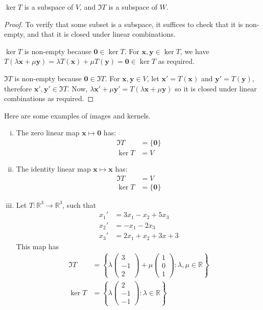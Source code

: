 \documentclass{article}
\begin{document}
\begin{lemma}
	$\ker T$ is a subspace of $V$, and $\Im T$ is a subspace of $W$.
\end{lemma}
\begin{proof}
	To verify that some subset is a subspace, it suffices to check that it is non-empty, and that it is closed under linear combinations.

	$\ker T$ is non-empty because $\bm 0 \in \ker T$. For $\bm x, \bm y \in \ker T$, we have $T(\lambda \bm x + \mu \bm y) = \lambda T(\bm x) + \mu T(\bm y) = \bm 0 \in \ker T$ as required.

	$\Im T$ is non-empty because $\bm 0 \in \Im T$. For $\bm x, \bm y \in V$, let $\bm x' = T(\bm x)$ and $\bm y' = T(\bm y)$, therefore $\bm x', \bm y' \in \Im T$. Now, $\lambda \bm x' + \mu \bm y' = T(\lambda \bm x + \mu \bm y)$ so it is closed under linear combinations as required.
\end{proof}
Here are some examples of images and kernels.
\begin{enumerate}[(i)]
	\item The zero linear map $\bm x \mapsto \bm 0$ has:
	      \begin{align*}
		      \Im T  & = \{ \bm 0 \} \\
		      \ker T & = V
	      \end{align*}
	\item The identity linear map $\bm x \mapsto \bm x$ has:
	      \begin{align*}
		      \Im T  & = V           \\
		      \ker T & = \{ \bm 0 \}
	      \end{align*}
	\item Let $T: \mathbb R^3 \to \mathbb R^3$, such that
	      \begin{align*}
		      x_1' & = 3x_1 - x_2 + 5x_3 \\
		      x_2' & = -x_1 - 2x_3       \\
		      x_3' & = 2x_1 + x_2 + 3x+3
	      \end{align*}
	      This map has
	      \begin{align*}
		      \Im T  & = \left\{ \lambda \begin{pmatrix} 3 \\ -1 \\ 2 \end{pmatrix} + \mu \begin{pmatrix} 1 \\ 0 \\ 1 \end{pmatrix} : \lambda, \mu \in \mathbb R \right\} \\
		      \ker T & = \left\{ \lambda \begin{pmatrix} 2 \\ -1 \\ -1 \end{pmatrix} : \lambda \in \mathbb R \right\}
	      \end{align*}
\end{enumerate}
\end{document}
